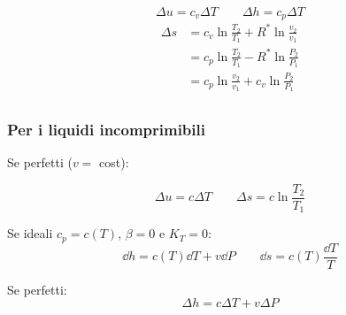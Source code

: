 \[ \Delta u = c_v \Delta T \qquad \Delta h = c_p \Delta T \]
\begin{align*}
    \Delta s &= c_v \ln{\frac{T_2}{T_1}} + R^*\ln{\frac{v_2}{v_1}} \\
    &= c_p \ln{\frac{T_2}{T_1}} - R^*\ln{\frac{P_2}{P_1}} \\
    &= c_p \ln{\frac{v_2}{v_1}} + c_v\ln{\frac{P_2}{P_1}} \\
\end{align*}

\subsubsection{Per i liquidi incomprimibili}

Se perfetti ($v =$ cost):

\[ \Delta u = c \Delta T \qquad \Delta s = c \ln{\frac{T_2}{T_1}} \]

Se ideali $c_p = c(T)$, $\beta = 0$ e $K_T = 0$:
\[ \dd{h} = c(T)\dd{T} + v\dd{P} \qquad \dd{s} = c(T)\frac{\dd{T}}{T} \]

Se perfetti:
\[ \Delta h = c\Delta T + v \Delta P \]
